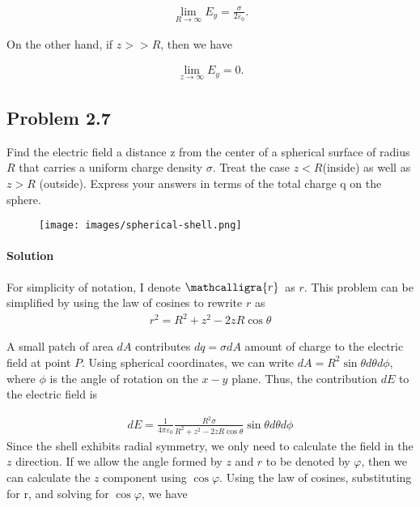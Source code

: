 \documentclass{article}
\newcommand{\scriptr}{\mathcalligra{r}\,}
\begin{document}
\begin{align*}
    \lim_{R \rightarrow \infty}E_y = \frac{\sigma}{2\varepsilon_0}.
\end{align*}

On the other hand, if $z >> R$, then we have 

\begin{align*}
    \lim_{z \rightarrow \infty}E_y = 0.
\end{align*}

\newpage

\subsection*{Problem 2.7}
Find the electric field a distance z from the center of a spherical surface of radius $R$ that carries a uniform charge density $\sigma$. Treat the case $z < R $(inside) as well as $z > R$ (outside). Express your answers in terms of the total charge q on the sphere.

\begin{figure}[h]
    \centering
    \texttt{[image: images/spherical-shell.png]}
\end{figure}

\paragraph{Solution} For simplicity of notation, I denote $\scriptr$ as $r$. 
This problem can be simplified by using the law of cosines to rewrite $r$ as 
\begin{align*}
    r^2 = R^2 + z^2 - 2zR\cos\theta
\end{align*}

A small patch of area $dA$ contributes $dq = \sigma dA$ amount of charge to the electric field at point $P$. Using spherical coordinates, we can write $dA = R^2\sin \theta d\theta d\phi$, where $\phi$ is the angle of rotation on the $x-y$ plane. Thus, the contribution $dE$ to the electric field is 

\begin{align*}
    dE = \frac{1}{4\pi\varepsilon_0}\frac{R^2\sigma}{R^2 + z^2 - 2zR\cos\theta} \sin \theta d\theta d\phi
\end{align*}
Since the shell exhibits radial symmetry, we only need to calculate the field in the $z$ direction. If we allow the angle formed by $z$ and $r$ to be denoted by $\varphi$, then we can calculate the $z$ component using $\cos \varphi$. Using the law of cosines, substituting for r, and solving for $\cos \varphi$, we have 
\end{document}
